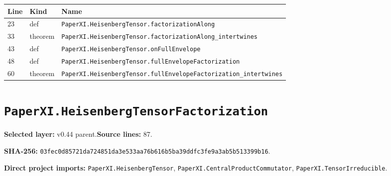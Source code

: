 \documentclass[10pt,oneside]{book}
\begin{document}
\begin{longtable}{@{}p{}p{}p{}@{}}\toprule Line&Kind&Name\\\midrule\endhead

23&def&\nolinkurl{PaperXI.HeisenbergTensor.factorizationAlong}\\

33&theorem&\nolinkurl{PaperXI.HeisenbergTensor.factorizationAlong_intertwines}\\

43&def&\nolinkurl{PaperXI.HeisenbergTensor.onFullEnvelope}\\

48&def&\nolinkurl{PaperXI.HeisenbergTensor.fullEnvelopeFactorization}\\

60&theorem&\nolinkurl{PaperXI.HeisenbergTensor.fullEnvelopeFactorization_intertwines}\\

\bottomrule\end{longtable}

\section{\texorpdfstring{\nolinkurl{PaperXI.HeisenbergTensorFactorization}}{PaperXI.HeisenbergTensorFactorization}}\label{module:PaperXI.HeisenbergTensorFactorization}

\textbf{Selected layer:} v0.44 parent.\quad\textbf{Source lines:} 87.\par\textbf{SHA-256:} {\scriptsize\nolinkurl{03fec0d85721da724851da3e533aa76b616b5ba39ddfc3fe9a3ab5b513399b16}}.


\textbf{Direct project imports:} \nolinkurl{PaperXI.HeisenbergTensor}, \nolinkurl{PaperXI.CentralProductCommutator}, \nolinkurl{PaperXI.TensorIrreducible}.
\end{document}
